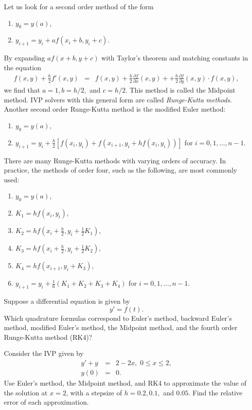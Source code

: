 Let us look for a second order method of the form 
\begin{enumerate}
\item $y_0 = y(a)$,
\item $y_{i+1} = y_i + a f(x_i+b, y_i+c)$.
\end{enumerate}
By expanding $a f(x+b, y+c)$ with Taylor's theorem and matching constants in the equation
\begin{eqnarray*}
f(x,y) + \frac{h}{2}f'(x,y) &=& f(x,y) + \frac{h}{2}\frac{\partial f}{\partial x}(x,y) +  + \frac{h}{2}\frac{\partial f}{\partial y}(x,y) \cdot f(x,y),
\end{eqnarray*}
we find that $a = 1, b = h/2,$ and $c = h/2$. This method is called the Midpoint method. IVP solvers with this general form are called \textit{Runge-Kutta methods}. Another second order Runge-Kutta method is the modified Euler method: 
\begin{enumerate}
\item $y_0 = y(a)$,
\item $y_{i+1} = y_i + \frac{h}{2}[ f(x_i, y_i) + f(x_{i+1}, y_i+ hf(x_i, y_i))]$ for $i = 0,1,\hdots, n-1$. 
\end{enumerate}

There are many Runge-Kutta methods with varying orders of accuracy. In practice, the methods of order four, such as the following, are most commonly used: 
\begin{enumerate}
\item $y_0 = y(a)$, 
\item $K_1 = hf(x_i,y_i)$,
\item $K_2 = hf(x_i + \frac{h}{2}, y_i + \frac{1}{2} K_1),$
\item $K_3 = hf(x_i + \frac{h}{2} , y_i + \frac{1}{2} K_2),$
\item $K_4 = hf(x_{i+1} , y_i +  K_3),$
\item $y_{i+1} = y_i + \frac{1}{6}(K_1 + K_2 + K_3 + K_4)$ for $i = 0,1,\hdots,n-1$.
\end{enumerate}




\begin{problem}
Suppose a differential equation is given by
\[ y' = f(t).\]
Which quadrature formulas correspond to Euler's method, backward Euler's method, modified Euler's method, the Midpoint method, and the fourth order Runge-Kutta method (RK4)? 
\end{problem}


\begin{problem}
Consider the IVP given by 
\begin{eqnarray*}
y' + y &=& 2-2x,\,\, 0 \leq x \leq 2, \\
y(0) &=& 0.
\end{eqnarray*}
Use Euler's method, the Midpoint method, and RK4 to approximate the value of the solution at $x = 2$, with a stepsize of $h = 0.2, 0.1,$ and $0.05 $. Find the relative error of each approximation.
\end{problem}




